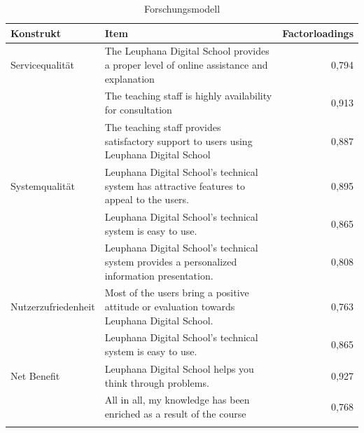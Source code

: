 
\begin{table}[ht] 
\footnotesize
\caption{Forschungsmodell}
\label{tab:Forschungsmodell} 
\begin{tabular}{@{}lp{10cm}r@{}} \toprule

\textbf{Konstrukt} & \textbf{Item} & \textbf{Factorloadings} \\ \midrule

Servicequalität & The Leuphana Digital School provides a proper level of online assistance and explanation & 0,794\\ 
& The teaching staff is highly availability for consultation & 0,913 \\
& The teaching staff provides satisfactory support to users using Leuphana Digital School & 0,887 \\ 
Systemqualität & Leuphana Digital School’s technical system has attractive features to appeal to the users. & 0,895\\ 
& Leuphana Digital School’s technical system is easy to use. & 0,865 \\
& Leuphana Digital School’s technical system provides a personalized information presentation. & 0,808 \\ 
Nutzerzufriedenheit & Most of the users bring a positive attitude or evaluation towards Leuphana Digital School. & 0,763\\ 
& Leuphana Digital School’s technical system is easy to use. & 0,865 \\ 
Net Benefit & Leuphana Digital School helps you think through problems.  & 0,927\\ 
& All in all, my knowledge has been enriched as a result of the course & 0,768 \\ \addlinespace 
  \bottomrule

\end{tabular}	
\end{table}




